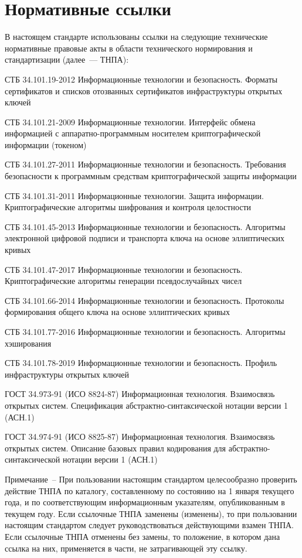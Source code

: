 \chapter{Нормативные ссылки}

В настоящем стандарте использованы ссылки на следующие технические 
нормативные правовые акты в области технического нормирования и 
стандартизации (далее~--- ТНПА): 

СТБ 34.101.19-2012 Информационные технологии и безопасность. Форматы 
сертификатов и списков отозванных сертификатов инфраструктуры открытых 
ключей 

СТБ 34.101.21-2009 Информационные технологии. Интерфейс обмена информацией
с аппаратно-программным носителем криптографической информации (токеном)

СТБ 34.101.27-2011 Информационные технологии и безопасность. Требования 
безопасности к программным средствам криптографической защиты информации 

СТБ 34.101.31-2011 Информационные технологии. Защита информации. 
Криптографические алгоритмы шифрования и контроля целостности 

СТБ 34.101.45-2013 Информационные технологии и безопасность. 
Алгоритмы электронной цифровой подписи и транспорта 
ключа на основе эллиптических кривых 

СТБ 34.101.47-2017 Информационные технологии и безопасность. 
Криптографические алгоритмы генерации псевдослучайных чисел 

СТБ 34.101.66-2014 Информационные технологии и безопасность. Протоколы 
формирования общего ключа на основе эллиптических кривых 

СТБ 34.101.77-2016 Информационные технологии и безопасность. 
Алгоритмы хэширования

СТБ 34.101.78-2019 Информационные технологии и безопасность. 
Профиль инфраструктуры открытых ключей

ГОСТ 34.973-91 (ИСО 8824-87) Информационная технология. Взаимосвязь 
открытых систем. Спецификация абстрактно-синтаксической нотации версии 1 
(АСН.1) 

ГОСТ 34.974-91 (ИСО 8825-87) Информационная технология. Взаимосвязь 
открытых систем. Описание базовых правил кодирования для 
абстрактно-синтаксической нотации версии 1 (АСН.1) 

\vskip6pt

\begin{note}
Примечание~-- При пользовании настоящим стандартом целесообразно проверить
действие ТНПА по каталогу, составленному по состоянию на 1 января текущего года,
и по соответствующим информационным указателям, опубликованным в текущем году.
%
Если ссылочные ТНПА заменены (изменены), то при пользовании настоящим
стандартом следует руководствоваться действующими взамен ТНПА.
Если ссылочные ТНПА отменены без замены, то положение, в котором дана ссылка
на них, применяется в части, не затрагивающей эту ссылку.
\end{note}
